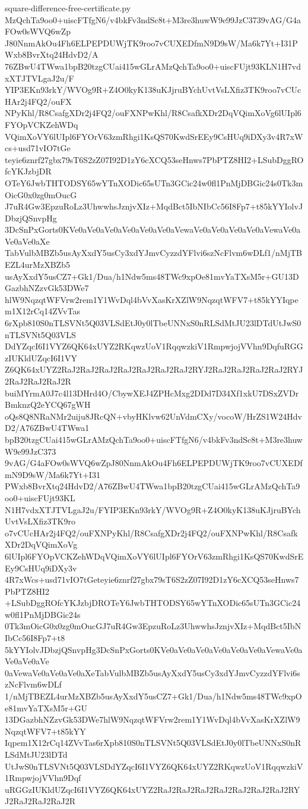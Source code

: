 \documentclass[11pt]{article}
\theoremstyle{definition}
\theoremstyle{remark}
\begin{document}
\begin{filecontents*}[overwrite]{square-difference-free-certificate.py}
MzQchTa9oo0+uiscFTfgN6/v4bkFv3ndSc8t+M3re3huwW9e99JzC3739vAG/G4aFOw0sWVQ6wZp
J80NnmAkOu4Fh6ELPEPDUWjTK9roo7vCUXEDfmN9D9sW/Ma6k7Yt+I31PWxb8BvrXtq24HdvD2/A
76ZBwU4TWwa1bpB20tzgCUai415wGLrAMzQchTa9oo0+uiscFUjt93KLN1H7vdxXTJTVLgaJ2u/F
YIP3EKn93rkY/WVOg9R+Z4O0kyK138uKJjruBYchUvtVsLXfiz3TK9roo7vCUcHAr2j4FQ2/ouFX
NPyKhl/R8CsafgXDr2j4FQ2/ouFXNPwKhl/R8CsafkXDr2DqVQimXoVg6lUIpl6FYOpVCKZehWDq
VQimXoVY6lUIpl6FYOrV63zmRhgi1KsQS70KwdSrEEy9CsHUq9iDXy3v4R7xWcs+usd71vIO7tGe
teyie6znrf27gbx79sT6S2zZ07I92D1zY6cXCQ53seHnws7PbPTZ8HI2+LSubDggROfcYKJzbjDR
OTeY6JwbTHTODSY65wYTnXODic65sUTn3GCic24w0fl1PnMjDBGic24s0Tk3mOicG0x0zg0mOucG
J7uR4Gw3EpzuRoLz3UhwwhsJznjvXIz+MqdBct5IbNIbCc56I8Fp7+t85kYYIolvJDbzjQSnvpHg
3DcSnPxGorts0KVe0aVe0aVe0aVe0aVe0aVe0aVewaVe0aVe0aVe0aVe0aVewaVe0aVe0aVe0aXe
TabVulbMBZb5usAyXxdY5usCy3xdYJmvCyzzdYFlvi6szNcFlvm6wDLf1/nMjTBEZL4urMzXBZb5
usAyXxdY5usCZ7+Gk1/Dua/h1Ndw5ms48TWc9xpOe81mvYaTXsM5r+GU13DGazbhNZzvGk53DWe7
hlW9NqzqtWFVrw2rem1Y1WvDql4bVvXasKrXZlW9NqzqtWFV7+t85kYYIqpem1X12rCq14ZVvTas
6rXpb810S0nTLSVNt5Q03VLSdEtJ0y0lTbeUNNxS0nRLSdMtJU23lDTdUtJwS0nTLSVNt5Q03VLS
DdYZqcI6I1VYZ6QK64xUYZ2RKqwzUoV1RqqwzkiV1RmpwjojVVhn9DqfuRGGzIUKldUZqcI6I1VY
Z6QK64xUYZ2RaJ2RaJ2RaJ2RaJ2RaJ2RaJ2RaJ2RYJ2RaJ2RaJ2RaJ2RaJ2RYJ2RaJ2RaJ2RaJ2R
buiMYrmA0J7c4l13DHrd4O/CbywXEJ4ZPHcMxg2DDd7D34Xf1xkU7DSxZVDrBmknzQ2eYCQ67gWH
oQs8Q8NRaNMr2uiju8JRcQN+vbyHKlvw62UnVdmCXy/vocoW/HrZS1W24HdvD2/A76ZBwU4TWwa1
bpB20tzgCUai415wGLrAMzQchTa9oo0+uiscFTfgN6/v4bkFv3ndSc8t+M3re3huwW9e99JzC373
9vAG/G4aFOw0sWVQ6wZpJ80NnmAkOu4Fh6ELPEPDUWjTK9roo7vCUXEDfmN9D9sW/Ma6k7Yt+I31
PWxb8BvrXtq24HdvD2/A76ZBwU4TWwa1bpB20tzgCUai415wGLrAMzQchTa9oo0+uiscFUjt93KL
N1H7vdxXTJTVLgaJ2u/FYIP3EKn93rkY/WVOg9R+Z4O0kyK138uKJjruBYchUvtVsLXfiz3TK9ro
o7vCUcHAr2j4FQ2/ouFXNPyKhl/R8CsafgXDr2j4FQ2/ouFXNPwKhl/R8CsafkXDr2DqVQimXoVg
6lUIpl6FYOpVCKZehWDqVQimXoVY6lUIpl6FYOrV63zmRhgi1KsQS70KwdSrEEy9CsHUq9iDXy3v
4R7xWcs+usd71vIO7tGeteyie6znrf27gbx79sT6S2zZ07I92D1zY6cXCQ53seHnws7PbPTZ8HI2
+LSubDggROfcYKJzbjDROTeY6JwbTHTODSY65wYTnXODic65sUTn3GCic24w0fl1PnMjDBGic24s
0Tk3mOicG0x0zg0mOucGJ7uR4Gw3EpzuRoLz3UhwwhsJznjvXIz+MqdBct5IbNIbCc56I8Fp7+t8
5kYYIolvJDbzjQSnvpHg3DcSnPxGorts0KVe0aVe0aVe0aVe0aVe0aVe0aVewaVe0aVe0aVe0aVe
0aVewaVe0aVe0aVe0aXeTabVulbMBZb5usAyXxdY5usCy3xdYJmvCyzzdYFlvi6szNcFlvm6wDLf
1/nMjTBEZL4urMzXBZb5usAyXxdY5usCZ7+Gk1/Dua/h1Ndw5ms48TWc9xpOe81mvYaTXsM5r+GU
13DGazbhNZzvGk53DWe7hlW9NqzqtWFVrw2rem1Y1WvDql4bVvXasKrXZlW9NqzqtWFV7+t85kYY
Iqpem1X12rCq14ZVvTas6rXpb810S0nTLSVNt5Q03VLSdEtJ0y0lTbeUNNxS0nRLSdMtJU23lDTd
UtJwS0nTLSVNt5Q03VLSDdYZqcI6I1VYZ6QK64xUYZ2RKqwzUoV1RqqwzkiV1RmpwjojVVhn9Dqf
uRGGzIUKldUZqcI6I1VYZ6QK64xUYZ2RaJ2RaJ2RaJ2RaJ2RaJ2RaJ2RaJ2RYJ2RaJ2RaJ2RaJ2R

\end{filecontents*}
\end{document}
